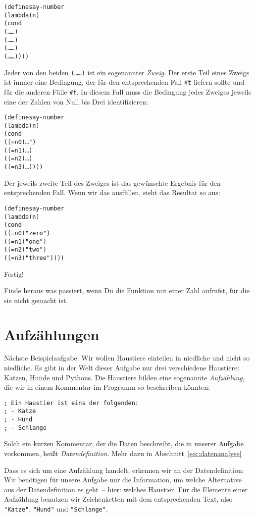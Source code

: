 \begin{alltt}
(define say-number
  (lambda (n)
    (cond
      (\ldots{} \ldots)
      (\ldots{} \ldots)
      (\ldots{} \ldots)
      (\ldots{} \ldots))))
\end{alltt}
%
Jeder von den beiden \texttt{(\ldots \ldots)} ist ein sogenannter
\textit{Zweig}.  Der erste Teil eines Zweigs ist immer
eine Bedingung, der für den entsprechenden Fall \verb|#t| liefern
sollte und für die anderen Fälle \verb|#f|.  In diesem Fall muss die
Bedingung jedes Zweiges jeweils eine der Zahlen von Null bis Drei
identifizieren:
%
\begin{alltt}
(define say-number
  (lambda (n)
    (cond
      ((= n 0) \ldots")
      ((= n 1) \ldots)
      ((= n 2) \ldots)
      ((= n 3) \ldots))))
\end{alltt}
%
Der jeweils zweite Teil des Zweiges ist das gewünschte Ergebnis für
den entsprechenden Fall.  Wenn wir das ausfüllen, sieht das Resultat
so aus:
%
\begin{alltt}
(define say-number
  (lambda (n)
    (cond
      ((= n 0) "zero")
      ((= n 1) "one")
      ((= n 2) "two")
      ((= n 3) "three"))))
\end{alltt}
%
Fertig!
\begin{aufgabe}
  Finde heraus was passiert, wenn Du die Funktion mit einer Zahl
  aufrufst, für die sie nicht gemacht ist.
\end{aufgabe}

\section{Aufzählungen}

Nächste Beispielaufgabe: Wir wollen Haustiere einteilen in niedliche
und nicht so niedliche.  Es gibt in der Welt dieser Aufgabe nur drei
verschiedene Haustiere: Katzen, Hunde und Pythons.  Die Haustiere
bilden eine sogenannte \textit{Aufzählung}, die wir
in einem Kommentar im Programm so beschreiben könnten:
%
\label{sec:datendefinition}
\begin{verbatim}
; Ein Haustier ist eins der folgenden:
; - Katze
; - Hund
; - Schlange
\end{verbatim}
%
Solch ein kurzen Kommentar, der die Daten beschreibt, die in unserer
Aufgabe vorkommen, heißt
\textit{Datendefinition}.  Mehr dazu in Abschnitt~\ref{sec:datenanalyse}

Dass es sich um eine Aufzählung handelt, erkennen wir an der
Datendefinition: Wir benötigen für unsere Aufgabe nur die Information,
um welche Alternative aus der Datendefinition es geht~-- hier: welches
Haustier.  Für die Elemente einer Aufzählung benutzen wir 
Zeichenketten mit dem entsprechenden Text, also \verb|"Katze"|,
\verb|"Hund"| und \verb|"Schlange"|.

